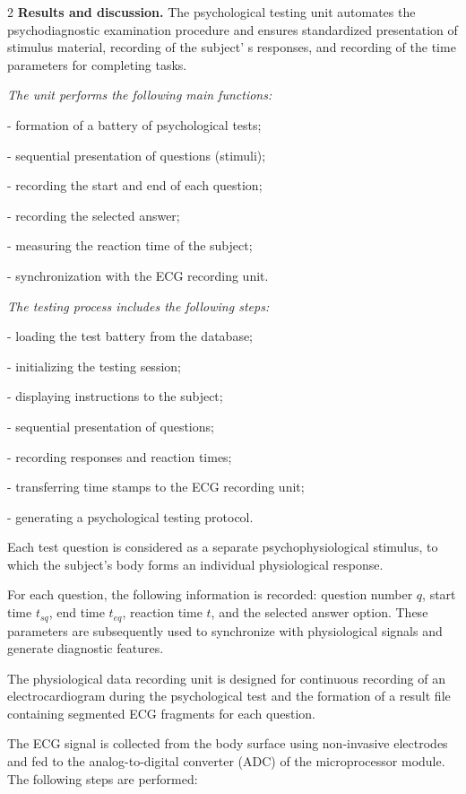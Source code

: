 \begin{multicols}{2}
{\bfseries Results and discussion.} The psychological testing unit
automates the psychodiagnostic examination procedure and ensures
standardized presentation of stimulus material, recording of the
subject' s responses, and recording of the time
parameters for completing tasks.

\emph{The unit performs the following main functions:}

- formation of a battery of psychological tests;

- sequential presentation of questions (stimuli);

- recording the start and end of each question;

- recording the selected answer;

- measuring the reaction time of the subject;

- synchronization with the ECG recording unit.

\emph{The testing process includes the following steps:}

- loading the test battery from the database;

- initializing the testing session;

- displaying instructions to the subject;

- sequential presentation of questions;

- recording responses and reaction times;

- transferring time stamps to the ECG recording unit;

- generating a psychological testing protocol.

Each test question is considered as a separate psychophysiological
stimulus, to which the subject's body forms an individual physiological
response.

For each question, the following information is recorded: question
number $q$, start time $t_{sq}$, end time $t_{eq}$, reaction time $t$,
and the selected answer option. These parameters are subsequently used
to synchronize with physiological signals and generate diagnostic
features.

The physiological data recording unit is designed for continuous
recording of an electrocardiogram during the psychological test and the
formation of a result file containing segmented ECG fragments for each
question.

The ECG signal is collected from the body surface using non-invasive
electrodes and fed to the analog-to-digital converter (ADC) of the
microprocessor module. The following steps are performed:


\end{multicols}
